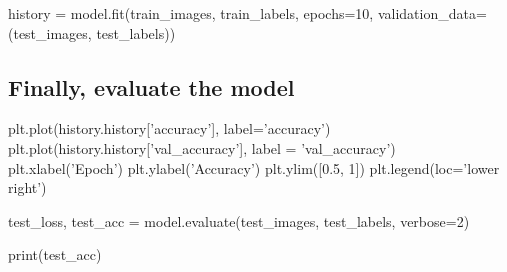 \documentclass[%
oneside,                 %
final,                   %
10pt]{article}
\begin{document}
history = model.fit(train_images, train_labels, epochs=10, 
                    validation_data=(test_images, test_labels))


\epycod


\subsection{Finally, evaluate the model}













\bpycod
plt.plot(history.history['accuracy'], label='accuracy')
plt.plot(history.history['val_accuracy'], label = 'val_accuracy')
plt.xlabel('Epoch')
plt.ylabel('Accuracy')
plt.ylim([0.5, 1])
plt.legend(loc='lower right')

test_loss, test_acc = model.evaluate(test_images,  test_labels, verbose=2)

print(test_acc)


\epycod




\end{document}
